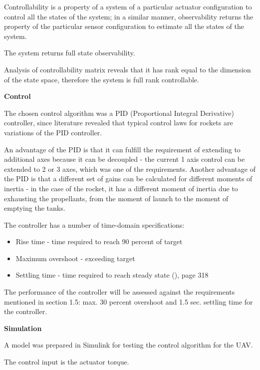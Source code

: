 Controllability is a property of a system of a particular actuator configuration to control all the states of the system; in a similar manner, observability returns the property of the particular sensor configuration to estimate all the states of the system. \cite{preumont2018vibration}

The system returns full state observability. 

Analysis of controllability matrix reveals that it has rank equal to the dimension of the state space, therefore the system is full rank controllable.

\textbf{Control}

The chosen control algorithm was a PID (Proportional Integral Derivative) controller, since literature revealed that typical control laws for rockets are variations of the PID controller. \cite{de2012spacecraft} \cite{taylor2017introduction}

An advantage of the PID is that it can fulfill the requirement of extending to additional axes because it can be decoupled - the current 1 axis control can be extended to 2 or 3 axes, which was one of the requirements. Another advantage of the PID is that a different set of gains can be calculated for different moments of inertia - in the case of the rocket, it has a different moment of inertia due to exhausting the propellants, from the moment of launch to the moment of emptying the tanks. 

The controller has a number of time-domain specifications:

\begin{itemize}
\item Rise time - time required to reach 90 percent of target
\item Maximum overshoot - exceeding target
\item Settling time - time required to reach steady state (\cite{de2012spacecraft}), page 318
\end{itemize}

The performance of the controller will be assessed against the requirements mentioned in section 1.5: max. 30 percent overshoot and 1.5 sec. settling time for the controller. 


\textbf{Simulation}

A model was prepared in Simulink for testing the control algorithm for the UAV. 

The control input is the actuator torque.

